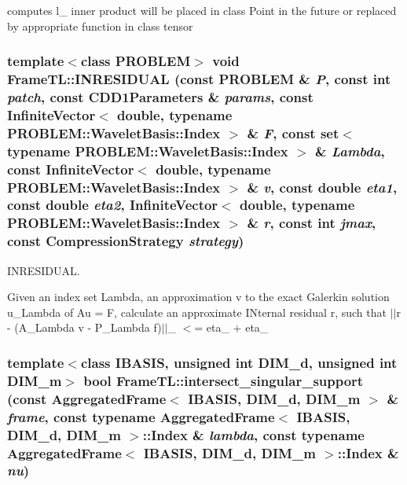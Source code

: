 computes l\_ inner product will be placed in class Point in the future or replaced by appropriate function in class tensor \hypertarget{namespaceFrameTL_cd7462527bff134a7c142ee0471d6ab2}{
\subsubsection[INRESIDUAL]{\setlength{\rightskip}{0pt plus 5cm}template$<$class PROBLEM$>$ void FrameTL::INRESIDUAL (const PROBLEM \& {\em P}, \/  const int {\em patch}, \/  const CDD1Parameters \& {\em params}, \/  const InfiniteVector$<$ double, typename PROBLEM::WaveletBasis::Index $>$ \& {\em F}, \/  const set$<$ typename PROBLEM::WaveletBasis::Index $>$ \& {\em Lambda}, \/  const InfiniteVector$<$ double, typename PROBLEM::WaveletBasis::Index $>$ \& {\em v}, \/  const double {\em eta1}, \/  const double {\em eta2}, \/  InfiniteVector$<$ double, typename PROBLEM::WaveletBasis::Index $>$ \& {\em r}, \/  const int {\em jmax}, \/  const CompressionStrategy {\em strategy})}}
\label{namespaceFrameTL_cd7462527bff134a7c142ee0471d6ab2}


INRESIDUAL. 

Given an index set Lambda, an approximation v to the exact Galerkin solution u\_\-Lambda of Au = F, calculate an approximate INternal residual r, such that $|$$|$r - (A\_\-Lambda v - P\_\-Lambda f)$|$$|$\_ $<$= eta\_ + eta\_ \hypertarget{namespaceFrameTL_27f6cca23b933ff76a0597a62f5dd870}{
\subsubsection[intersect\_\-singular\_\-support]{\setlength{\rightskip}{0pt plus 5cm}template$<$class IBASIS, unsigned int DIM\_\-d, unsigned int DIM\_\-m$>$ bool FrameTL::intersect\_\-singular\_\-support (const AggregatedFrame$<$ IBASIS, DIM\_\-d, DIM\_\-m $>$ \& {\em frame}, \/  const typename AggregatedFrame$<$ IBASIS, DIM\_\-d, DIM\_\-m $>$::Index \& {\em lambda}, \/  const typename AggregatedFrame$<$ IBASIS, DIM\_\-d, DIM\_\-m $>$::Index \& {\em nu})}}
\label{namespaceFrameTL_27f6cca23b933ff76a0597a62f5dd870}


